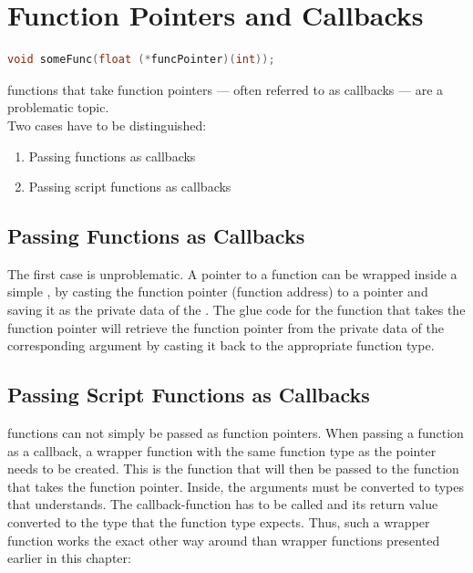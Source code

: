 \section{Function Pointers and Callbacks}

\SingleSpacing
\begin{lstlisting}[language=C++, caption=\myProperName{C++} function that takes a function pointer]
void someFunc(float (*funcPointer)(int));
\end{lstlisting}
\OnehalfSpacing

 functions that take function pointers --- often referred to as callbacks --- are a problematic topic.\\
Two cases have to be distinguished:
\begin{enumerate}
\item Passing  functions as callbacks
\item Passing script functions as callbacks
\end{enumerate}

\subsection{Passing  Functions as Callbacks}

The first case is unproblematic. A pointer to a  function can be wrapped inside a simple , by casting the function pointer (function address) to a  pointer and saving it as the private data of the . The glue code for the function that takes the function pointer will retrieve the function pointer from the private data of the corresponding argument by casting it back to the appropriate function type.

\subsection{Passing Script Functions as Callbacks}

 functions can not simply be passed as  function pointers. When passing a  function as a callback, a wrapper function with the same function type as the pointer needs to be created. This is the  function that will then be passed to the function that takes the function pointer. Inside, the  arguments must be converted to types that  understands. The  callback-function has to be called and its return value converted to the  type that the function type expects. Thus, such a wrapper function works the exact other way around than wrapper functions presented earlier in this chapter:

